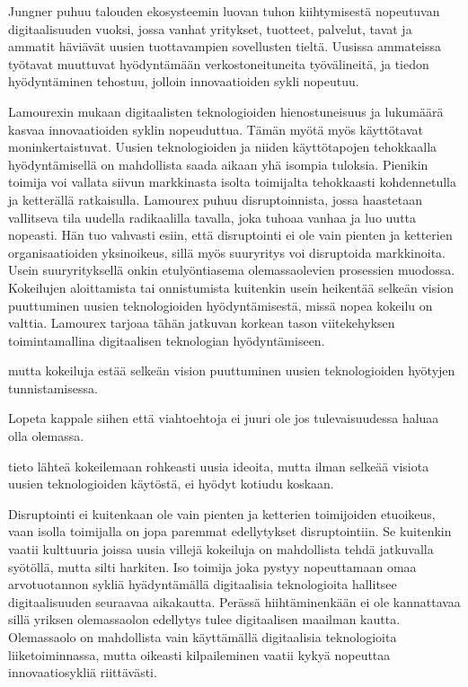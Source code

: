 \documentclass[finnish,12pt,a4paper,pdftex]{article}
\begin{document}
Jungner \citeyearpar{jungner} puhuu talouden ekosysteemin luovan tuhon kiihtymisestä nopeutuvan digitaalisuuden vuoksi, jossa vanhat yritykset, tuotteet, palvelut, tavat ja ammatit häviävät uusien tuottavampien sovellusten tieltä. Uusissa ammateissa työtavat muuttuvat hyödyntämään verkostoneituneita työvälineitä, ja tiedon hyödyntäminen tehostuu, jolloin innovaatioiden sykli nopeutuu. 

Lamourexin \citeyearpar{lamoureux} mukaan digitaalisten teknologioiden hienostuneisuus ja lukumäärä kasvaa innovaatioiden syklin nopeuduttua. Tämän myötä myös käyttötavat moninkertaistuvat. Uusien teknologioiden ja niiden käyttötapojen tehokkaalla hyödyntämisellä on mahdollista saada aikaan yhä isompia tuloksia. Pienikin toimija voi vallata siivun markkinasta isolta toimijalta tehokkaasti kohdennetulla ja ketterällä ratkaisulla. Lamourex \citeyearpar{lamoureux} puhuu disruptoinnista, jossa haastetaan vallitseva tila uudella radikaalilla tavalla, joka tuhoaa vanhaa ja luo uutta nopeasti. Hän tuo vahvasti esiin, että disruptointi ei ole vain pienten ja ketterien organisaatioiden yksinoikeus, sillä myös suuryritys voi disruptoida markkinoita. Usein suuryrityksellä onkin etulyöntiasema olemassaolevien prosessien muodossa. Kokeilujen aloittamista tai onnistumista kuitenkin usein heikentää selkeän vision puuttuminen uusien teknologioiden hyödyntämisestä, missä nopea kokeilu on valttia. Lamourex tarjoaa tähän jatkuvan korkean tason viitekehyksen toimintamallina digitaalisen teknologian hyödyntämiseen.



mutta kokeiluja estää selkeän vision puuttuminen uusien teknologioiden hyötyjen tunnistamisessa.

Lopeta kappale siihen että viahtoehtoja ei juuri ole jos tulevaisuudessa haluaa olla olemassa.


tieto lähteä kokeilemaan rohkeasti uusia ideoita, mutta ilman selkeää visiota uusien teknologioiden käytöstä, ei hyödyt kotiudu koskaan. 

Disruptointi ei kuitenkaan ole vain pienten ja ketterien toimijoiden etuoikeus, vaan isolla toimijalla on jopa paremmat edellytykset disruptointiin. Se kuitenkin vaatii kulttuuria joissa uusia villejä kokeiluja on mahdollista tehdä jatkuvalla syötöllä, mutta silti harkiten. Iso toimija joka pystyy nopeuttamaan omaa arvotuotannon sykliä hyädyntämällä digitaalisia teknologioita hallitsee digitaalisuuden seuraavaa aikakautta. Perässä hiihtäminenkään ei ole kannattavaa sillä yriksen olemassaolon edellytys tulee digitaalisen maailman kautta. Olemassaolo on mahdollista vain käyttämällä digitaalisia teknologioita liiketoiminnassa, mutta oikeasti kilpaileminen vaatii kykyä nopeuttaa innovaatiosykliä riittävästi.
\end{document}
